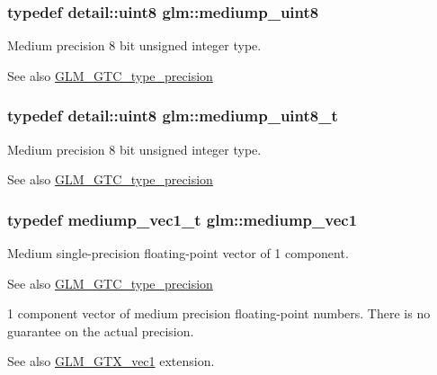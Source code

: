 \subsubsection[{\texorpdfstring{mediump\+\_\+uint8}{mediump_uint8}}]{\setlength{\rightskip}{0pt plus 5cm}typedef detail\+::uint8 {\bf glm\+::mediump\+\_\+uint8}}\hypertarget{group__gtc__type__precision_gac4b849eaac0543a10f97f4bdda4850a8}{}\label{group__gtc__type__precision_gac4b849eaac0543a10f97f4bdda4850a8}
Medium precision 8 bit unsigned integer type. \begin{DoxySeeAlso}{See also}
\hyperlink{group__gtc__type__precision}{G\+L\+M\+\_\+\+G\+T\+C\+\_\+type\+\_\+precision} 
\end{DoxySeeAlso}
\subsubsection[{\texorpdfstring{mediump\+\_\+uint8\+\_\+t}{mediump_uint8_t}}]{\setlength{\rightskip}{0pt plus 5cm}typedef detail\+::uint8 {\bf glm\+::mediump\+\_\+uint8\+\_\+t}}\hypertarget{group__gtc__type__precision_gadfa38f3c245d371c4b2079f1fd68928b}{}\label{group__gtc__type__precision_gadfa38f3c245d371c4b2079f1fd68928b}
Medium precision 8 bit unsigned integer type. \begin{DoxySeeAlso}{See also}
\hyperlink{group__gtc__type__precision}{G\+L\+M\+\_\+\+G\+T\+C\+\_\+type\+\_\+precision} 
\end{DoxySeeAlso}
\subsubsection[{\texorpdfstring{mediump\+\_\+vec1}{mediump_vec1}}]{\setlength{\rightskip}{0pt plus 5cm}typedef mediump\+\_\+vec1\+\_\+t {\bf glm\+::mediump\+\_\+vec1}}\hypertarget{group__gtc__type__precision_ga1b734d715033ab3026b2fb27e1fb7d3e}{}\label{group__gtc__type__precision_ga1b734d715033ab3026b2fb27e1fb7d3e}
Medium single-\/precision floating-\/point vector of 1 component. \begin{DoxySeeAlso}{See also}
\hyperlink{group__gtc__type__precision}{G\+L\+M\+\_\+\+G\+T\+C\+\_\+type\+\_\+precision}
\end{DoxySeeAlso}
1 component vector of medium precision floating-\/point numbers. There is no guarantee on the actual precision. \begin{DoxySeeAlso}{See also}
\hyperlink{group__gtx__vec1}{G\+L\+M\+\_\+\+G\+T\+X\+\_\+vec1} extension. 
\end{DoxySeeAlso}
